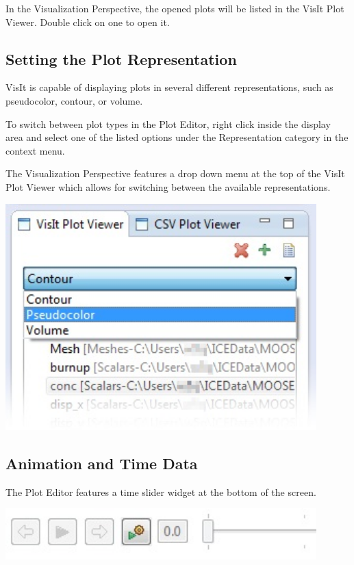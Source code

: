 In the Visualization Perspective, the opened plots will be listed in the VisIt
Plot Viewer. Double click on one to open it.

\subsection{Setting the Plot Representation}

VisIt is capable of displaying plots in several different representations, such
as pseudocolor, contour, or volume.

To switch between plot types in the Plot Editor, right click inside the display
area and select one of the listed options under the Representation category in the
context menu.

The Visualization Perspective features a drop down menu at the top of the VisIt
Plot Viewer which allows for switching between the available representations. 

\begin{center}
\includegraphics[width=12cm]{images/VisItRepresentationDropDown}
\end{center}

\subsection{Animation and Time Data}

The Plot Editor features a time slider widget at the bottom of the screen. 

\begin{center}
\includegraphics[width=12cm]{images/TimeSliderWidget}
\end{center}

